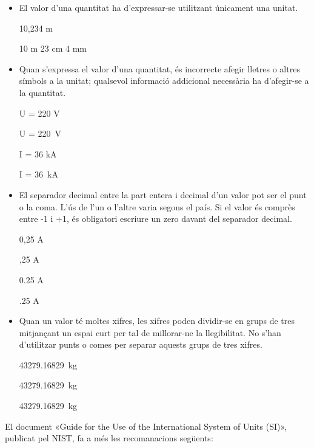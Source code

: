 \begin{itemize}
\textcolor{Red}\faTimesCircle{}   \SI{20}{\ohm.m} són 20 ohm multiplicat per metre


\item El valor d'una quantitat ha d'expressar-se  utilitzant únicament una
unitat.

\textcolor{Green}\faCheckSquare{} 10,234 m

\textcolor{Red}\faTimesCircle{}  10 m 23 cm 4 mm


\item Quan s'expressa el valor d'una quantitat, és incorrecte afegir
lletres o altres símbols a la unitat; qualsevol informació
addicional necessària ha d'afegir-se a la quantitat.

\textcolor{Green}\faCheckSquare{} U = 220 V

\textcolor{Red}\faTimesCircle{}  U = \SI{220}{V}

\textcolor{Green}\faCheckSquare{}  I = 36 kA

\textcolor{Red}\faTimesCircle{}   I = \SI{36}{kA}


\item El separador decimal entre la part entera i decimal d'un valor pot ser el punt o la coma. L'ús de l'un o l'altre varia segons el país. Si el valor és comprès entre -1 i +1, és obligatori escriure un zero davant del separador decimal.

\textcolor{Green}\faCheckSquare{} 0,25 A

\textcolor{Red}\faTimesCircle{}  ,25 A

\textcolor{Green}\faCheckSquare{} 0.25 A

\textcolor{Red}\faTimesCircle{}  .25 A


\item Quan un valor té moltes xifres, les xifres poden dividir-se en grups de tres mitjançant un espai curt per tal de millorar-ne la llegibilitat. No s'han d'utilitzar punts o comes per separar aquests grups de tres xifres.

\textcolor{Green}\faCheckSquare{} \SI{43279,16829}{kg}

\textcolor{Green}\faCheckSquare{} \SI[group-separator =]{43279,16829}{kg}

\textcolor{Red}\faTimesCircle{}  \SI[group-separator = .]{43279,16829}{kg}

\end{itemize}

El document  «Guide for the Use of the International System of Units (SI)», publicat pel NIST,  fa a més les recomanacions següents:

